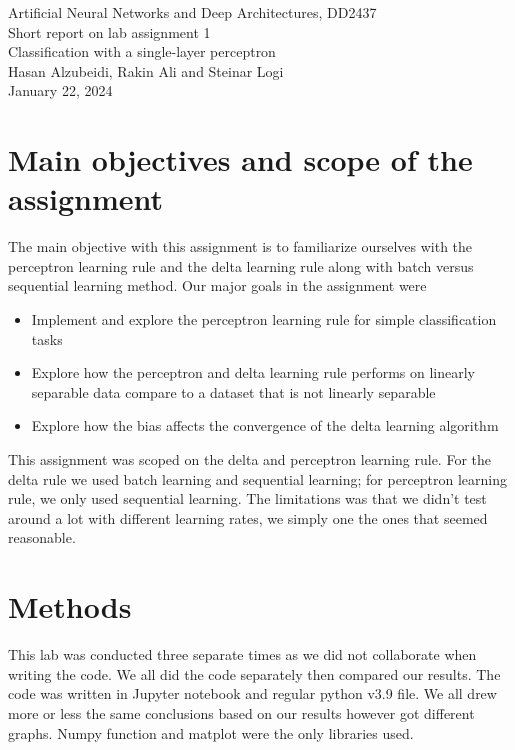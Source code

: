 \documentclass[a4paper]{article}
\begin{document}
\begin{center}
  {\large Artificial Neural Networks and Deep Architectures, DD2437}\\
  \vspace{7mm}
  {\huge Short report on lab assignment 1\\[1ex]}
  {\Large Classification with a single-layer perceptron}\\
  \vspace{8mm}  
  {\Large Hasan Alzubeidi, Rakin Ali and Steinar Logi \\}
  \vspace{4mm}
  {\large January 22, 2024 \\}
\end{center}

\section{Main objectives and scope of the assignment \normalsize}
The main objective with this assignment is to familiarize ourselves with the perceptron learning rule and the delta learning rule along with batch versus sequential learning method. 
Our major goals in the assignment were  
\begin{itemize}
\item Implement and explore the perceptron learning rule for simple classification tasks
\item Explore how the perceptron and delta learning rule performs on linearly separable data compare to a dataset that is not linearly separable
\item Explore how the bias affects the convergence of the delta learning algorithm
\end{itemize}

This assignment was scoped on the delta and perceptron learning rule. For the delta rule we used batch learning and sequential learning; for perceptron learning rule, we only used sequential learning. The limitations was that we didn't test around a lot with different learning rates, we simply one the ones that seemed reasonable. 

\section{Methods} This lab was conducted three separate times as we did not collaborate when writing the code. We all did the code separately then compared our results. The code was written in Jupyter notebook and regular python v3.9 file. We all drew more or less the same conclusions based on our results however got different graphs. Numpy function and matplot were the only libraries used.  \\
\end{document}
